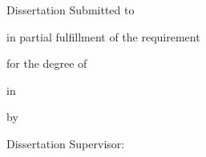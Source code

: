 {\begin{titlepage}
\begin{center}
    \parbox[t][74pt][t]{\textwidth}{\erhao
    \begin{center} {\sffamily  {}} \end{center} }
    \parbox[t][44pt][t]{\textwidth}{\begin{center} \end{center} }
    \begin{center} {\sanhao   Dissertation Submitted to}\end{center}
\begin{center} {\sanhao \bfseries {}}\end{center}
    \begin{center} {\sanhao  in partial fulfillment of the requirement}\end{center} 
    \begin{center} {\sanhao  for the degree of}\end{center}
    \begin{center} {\sffamily \sanhao  {}}\end{center}
    \begin{center} {\sanhao  }\end{center}
     \begin{center} {\sanhao  in}\end{center}
    \begin{center} {\sffamily \sanhao \pmb{ \makebox[118mm]{\@esubject}}}\end{center}
     \begin{center} {\erhao  }\end{center}
     \begin{center} {\sanhao  by}\end{center}
    \begin{center} {\sffamily \sanhao \pmb{ \makebox[93mm]{\@eauthor}}}\end{center}
     \begin{center} {\yihao }\end{center}
     \begin{center}{\xiaosan Dissertation Supervisor:\quad  \makebox[55mm]{\@esupervisor}} \end{center}
     


\end{center}
\end{titlepage}}
